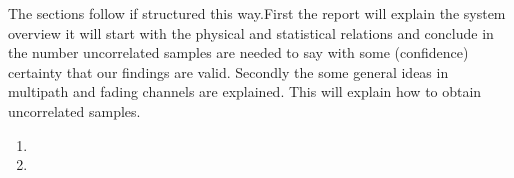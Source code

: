 The sections follow if structured this way.First the report will explain the system overview it will start with the physical and statistical relations and conclude in the number uncorrelated samples are needed to say with some (confidence) certainty that our findings are valid. Secondly the some general ideas in multipath and fading channels are explained. This will explain how to obtain uncorrelated samples.

\begin{enumerate}
	\item 
	\item 
\end{enumerate}
 




